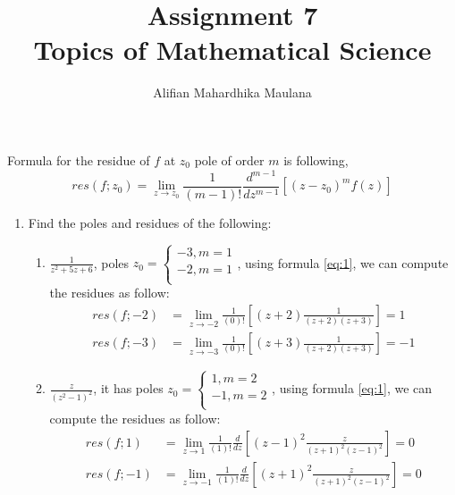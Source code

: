 \documentclass[a4paper,12pt]{article}
\title{Assignment 7\\ Topics of Mathematical Science}
\author{Alifian Mahardhika Maulana}
\begin{document}
\maketitle
		Formula for the residue of $f$ at $z_0$ pole of order $m$ is following,
		\begin{equation}\label{eq:1}
		res(f;z_0) = \lim_{z\to z_0} \frac{1}{(m-1)!} \frac{d^{m-1}}{dz^{m-1}} \left[ (z-z_0)^m f(z)\right]
		\end{equation}
\begin{enumerate}
	\item Find the poles and residues of the following:
	\begin{enumerate}
		\item $\frac{1}{z^2+5z+6}$, poles $z_0=\begin{cases}
		-3, m= 1\\
		-2, m= 1\\
		\end{cases}$, using formula \eqref{eq:1}, we can compute the residues as follow:
		\begin{equation*}
		\begin{aligned}
		res(f;-2) &= \lim_{z\to -2} \frac{1}{(0)!} \left[ (z+2) \frac{1}{(z+2)(z+3)}\right] = 1\\
		res(f;-3) &= \lim_{z\to -3} \frac{1}{(0)!} \left[ (z+3) \frac{1}{(z+2)(z+3)}\right] = -1
		\end{aligned}
		\end{equation*}
		
		\item $\frac{z}{(z^2-1)^2}$, it has poles $z_0=\begin{cases}
		1, m= 2\\
		-1, m= 2\\
		\end{cases}$, using formula \eqref{eq:1}, we can compute the residues as follow:
		\begin{equation*}
		\begin{aligned}
		res(f;1) &= \lim_{z\to 1} \frac{1}{(1)!} \frac{d}{dz} \left[ (z-1)^2 \frac{z}{(z+1)^2(z-1)^2}\right] = 0\\
		res(f;-1) &= \lim_{z\to -1} \frac{1}{(1)!} \frac{d}{dz} \left[ (z+1)^2 \frac{z}{(z+1)^2(z-1)^2}\right] = 0\\
		\end{aligned}
		\end{equation*}
		

\end{enumerate}
\end{enumerate}
\end{document}
